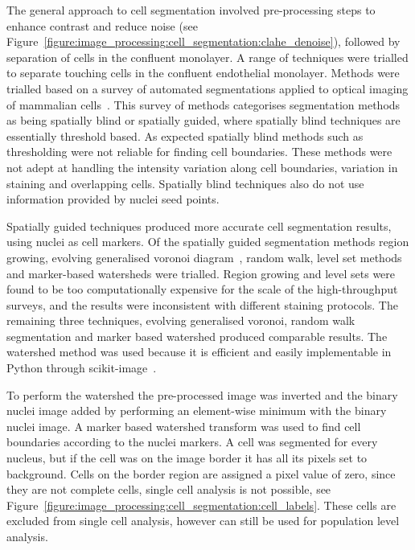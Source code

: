 The general approach to cell segmentation involved pre-processing steps to enhance contrast and reduce noise (see Figure~\ref{figure:image_processing:cell_segmentation:clahe_denoise}), followed by separation of cells in the confluent monolayer. A range of techniques were trialled to separate touching cells in the confluent endothelial monolayer. Methods were trialled based on a survey of automated segmentations applied to optical imaging of mammalian cells~\cite{Bajcsy2015}. This survey of methods categorises segmentation methods as being spatially blind or spatially guided, where spatially blind techniques are essentially threshold based. As expected spatially blind methods such as thresholding were not reliable for finding cell boundaries. These methods were not adept at handling the intensity variation along cell boundaries, variation in staining and overlapping cells. Spatially blind techniques also do not use information provided by nuclei seed points.

Spatially guided techniques produced more accurate cell segmentation results, using nuclei as cell markers. Of the spatially guided segmentation methods region growing, evolving generalised voronoi diagram~\cite{Yu2010}, random walk, level set methods and marker-based watersheds were trialled. Region growing and level sets were found to be too computationally expensive for the scale of the high-throughput surveys, and the results were inconsistent with different staining protocols. The remaining three techniques, evolving generalised voronoi, random walk segmentation and marker based watershed produced comparable results. The watershed method was used because it is efficient and easily implementable in Python through scikit-image~\cite{VanderWalt2014}.

To perform the watershed the pre-processed image was inverted and the binary nuclei image added by performing an element-wise minimum with the binary nuclei image. A marker based watershed transform was used to find cell boundaries according to the nuclei markers. A cell was segmented for every nucleus, but if the cell was on the image border it has all its pixels set to background. Cells on the border region are assigned a pixel value of zero, since they are not complete cells, single cell analysis is not possible, see Figure~\ref{figure:image_processing:cell_segmentation:cell_labels}. These cells are excluded from single cell analysis, however can still be used for population level analysis.

